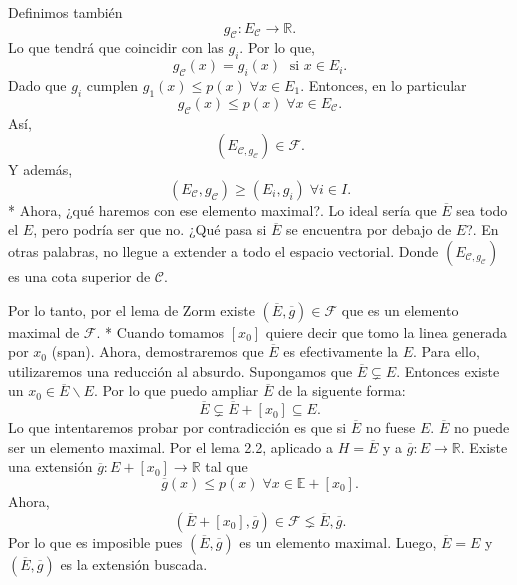 \begin{paracol}{2}
\begin{teo}
	Definimos también 
	$$g_{\mathscr{C}}:E_{\mathscr{C}}\to \mathbb{R}.$$
	Lo que tendrá que coincidir con las $g_i$. Por lo que,
	$$g_{\mathscr{C}}(x)=g_i(x)\; \text{ si } x\in E_i.$$
	Dado que $g_i$ cumplen  $g_1(x)\leq p(x)\; \forall x\in E_1$. Entonces, en lo particular 
	$$g_{\mathscr{C}}(x)\leq p(x)\; \forall x\in E_{\mathscr{C}}.$$
	Así,
	$$\left(E_{\mathscr{C},g_{\mathscr{C}}}\right)\in \mathscr{F}.$$
	Y además,
	$$\left(E_{\mathscr{C}},g_{\mathscr{C}}\right)\geq \left(E_i,g_i\right)\; \forall i\in I.$$
\switchcolumn[1]*{\noindent\scriptsize
	Ahora, ¿qué haremos con ese elemento maximal?. Lo ideal sería que $\overline{E}$ sea todo el $E$, pero podría ser que no. ¿Qué pasa si $\overline{E}$ se encuentra por debajo de $E$?. En otras palabras, no llegue a extender a todo el espacio vectorial.
}
\switchcolumn[0]
	Donde $\left(E_{\mathscr{C},g_{\mathscr{C}}}\right)$ es una cota superior de $\mathscr{C}.$

	Por lo tanto, por el lema de Zorm existe $\left(\overline{E},\overline{g}\right)\in \mathscr{F}$ que es un elemento maximal de $\mathscr{F}$.
\switchcolumn[1]*{\noindent\scriptsize
    Cuando tomamos $[x_0]$ quiere decir que tomo la linea generada por $x_0$ (span).
} 
\switchcolumn[0]
	Ahora, demostraremos que $\overline{E}$ es efectivamente la $E$. Para ello, utilizaremos una reducción al absurdo. Supongamos que $\overline{E}\subsetneq E$. Entonces existe un $x_0\in \overline{E} \backslash E$. Por lo que puedo ampliar $\overline{E}$ de la siguente forma:
	$$\overline{E} \subsetneq \overline{E}+[x_0]\subseteq E.$$
	Lo que intentaremos probar por contradicción es que si $\overline{E}$ no fuese $E$. $\overline{E}$ no puede ser un elemento maximal. Por el lema 2.2, aplicado a $H=\overline{E}$ y a $\overline{g}:E\to \mathbb{R}$. Existe una extensión $\overline{g}:E+[x_0]\to \mathbb{R}$ tal que 
	$$\overline{g}(x)\leq p(x)\; \forall x\in \mathbb{E}+[x_0].$$
	Ahora, $$\left(\overline{E}+[x_0],\overline{g}\right)\in \mathscr{F}\lneq \overline{E},\overline{g}.$$ 
	Por lo que es imposible pues $\left(\overline{E},\overline{g}\right)$ es un elemento maximal. Luego, $\overline{E}=E$  y $\left(\overline{E},\overline{g}\right)$ es la extensión buscada.
\end{teo}




\end{paracol}

